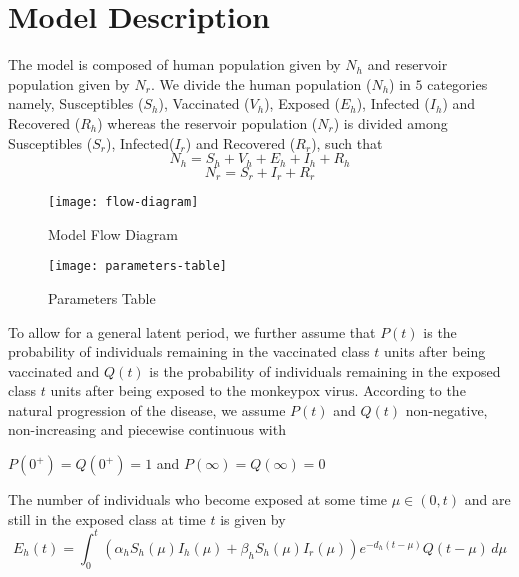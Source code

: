 \newcommand{\package}[1]{\textbf{#1}} %
\newcommand{\cmmd}[1]{\textbackslash\texttt{#1}} %


\chapter{Model Description}

The model is composed of human population given by $N_{h}$ and
reservoir population given by $N_{r}$. We divide the human population ($N_{h}$) in $5$ categories namely, Susceptibles ($S_{h}$), Vaccinated ($V_{h}$), Exposed ($E_{h}$), Infected ($I_{h}$) and Recovered ($R_{h}$) whereas the reservoir population ($N_{r}$) is divided among Susceptibles ($S_{r}$), Infected($I_{r}$) and Recovered ($R_{r}$), such that
\[N_{h} = S_{h} + V_{h} + E_{h} + I_{h} + R_{h}\]
\[N_{r} = S_{r} + I_{r} + R_{r}\]
\begin{figure}[h]
\texttt{[image: flow-diagram]}
\caption{Model Flow Diagram}
\centering
\end{figure}
\begin{figure}[h] \hspace{60pt}
\texttt{[image: parameters-table]}
\caption{Parameters Table}
\end{figure}

To allow for a general latent period, we further assume that $P(t)$ is the probability of individuals remaining in the vaccinated class $t$ units after being vaccinated and $Q(t)$ is the probability of individuals remaining in the exposed class $t$ units after being exposed to the monkeypox virus.
According to the natural progression of the disease, we assume $P(t)$ and $Q(t)$ non-negative, non-increasing and piecewise continuous with 
\begin{center}
$P(0^{+}) = Q(0^{+}) = 1$ and $P(\infty) = Q(\infty) = 0$
\end{center}

The number of individuals who become exposed at some time $\mu \in (0,t)$ and are still in the exposed class at time $t$ is given by
\begin{equation}
E_{h}(t) = \int_{0}^{t} (\alpha_{h}S_{h}(\mu)I_{h}(\mu) +\beta_{h}S_{h}(\mu)I_{r}(\mu)) e^{-d_{h}(t-\mu)}Q(t-\mu) \,d\mu \label{exposed}
\end{equation}


